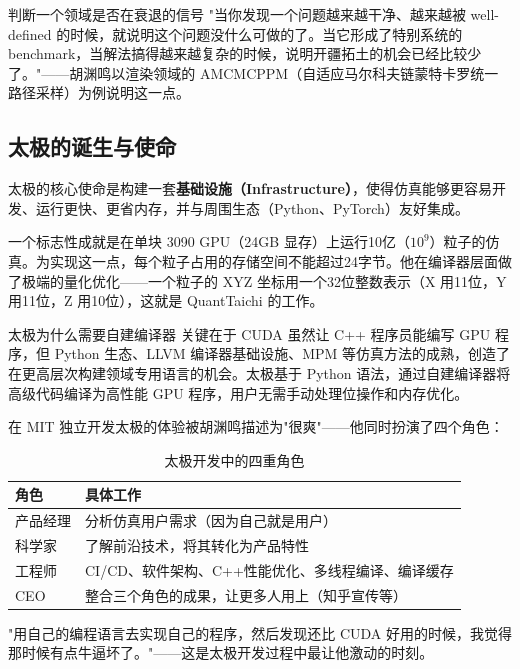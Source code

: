 \documentclass[a4paper]{article}
\begin{document}
\begin{knowledgebox}{判断一个领域是否在衰退的信号}
"当你发现一个问题越来越干净、越来越被 well-defined 的时候，就说明这个问题没什么可做的了。当它形成了特别系统的 benchmark，当解法搞得越来越复杂的时候，说明开疆拓土的机会已经比较少了。"——胡渊鸣以渲染领域的 AMCMCPPM（自适应马尔科夫链蒙特卡罗统一路径采样）为例说明这一点。
\end{knowledgebox}

\subsection{太极的诞生与使命}

太极的核心使命是构建一套\textbf{基础设施（Infrastructure）}，使得仿真能够更容易开发、运行更快、更省内存，并与周围生态（Python、PyTorch）友好集成。

一个标志性成就是在单块 3090 GPU（24GB 显存）上运行10亿（$10^9$）粒子的仿真。为实现这一点，每个粒子占用的存储空间不能超过24字节。他在编译器层面做了极端的量化优化——一个粒子的 XYZ 坐标用一个32位整数表示（X 用11位，Y 用11位，Z 用10位），这就是 QuantTaichi 的工作。

\begin{importantbox}{太极为什么需要自建编译器}
关键在于 CUDA 虽然让 C++ 程序员能编写 GPU 程序，但 Python 生态、LLVM 编译器基础设施、MPM 等仿真方法的成熟，创造了在更高层次构建领域专用语言的机会。太极基于 Python 语法，通过自建编译器将高级代码编译为高性能 GPU 程序，用户无需手动处理位操作和内存优化。
\end{importantbox}

在 MIT 独立开发太极的体验被胡渊鸣描述为"很爽"——他同时扮演了四个角色：

\begin{table}[H]
\centering
\caption{太极开发中的四重角色}
\begin{tabular}{ll}
\toprule
\textbf{角色} & \textbf{具体工作} \\
\midrule
产品经理 & 分析仿真用户需求（因为自己就是用户） \\
科学家 & 了解前沿技术，将其转化为产品特性 \\
工程师 & CI/CD、软件架构、C++性能优化、多线程编译、编译缓存 \\
CEO & 整合三个角色的成果，让更多人用上（知乎宣传等） \\
\bottomrule
\end{tabular}
\end{table}

"用自己的编程语言去实现自己的程序，然后发现还比 CUDA 好用的时候，我觉得那时候有点牛逼坏了。"——这是太极开发过程中最让他激动的时刻。
\end{document}
